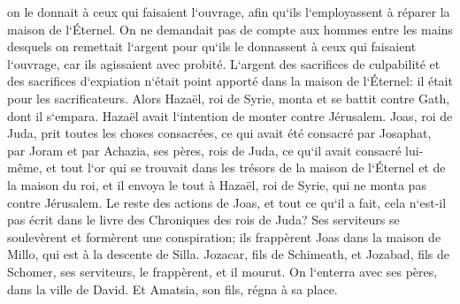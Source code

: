 \verse on le donnait à ceux qui faisaient l`ouvrage, afin qu`ils l`employassent à réparer la maison de l`Éternel. 
\verse On ne demandait pas de compte aux hommes entre les mains desquels on remettait l`argent pour qu`ils le donnassent à ceux qui faisaient l`ouvrage, car ils agissaient avec probité. 
\verse L`argent des sacrifices de culpabilité et des sacrifices d`expiation n`était point apporté dans la maison de l`Éternel: il était pour les sacrificateurs. 
\verse Alors Hazaël, roi de Syrie, monta et se battit contre Gath, dont il s`empara. Hazaël avait l`intention de monter contre Jérusalem. 
\verse Joas, roi de Juda, prit toutes les choses consacrées, ce qui avait été consacré par Josaphat, par Joram et par Achazia, ses pères, rois de Juda, ce qu`il avait consacré lui-même, et tout l`or qui se trouvait dans les trésors de la maison de l`Éternel et de la maison du roi, et il envoya le tout à Hazaël, roi de Syrie, qui ne monta pas contre Jérusalem. 
\verse Le reste des actions de Joas, et tout ce qu`il a fait, cela n`est-il pas écrit dans le livre des Chroniques des rois de Juda? 
\verse Ses serviteurs se soulevèrent et formèrent une conspiration; ils frappèrent Joas dans la maison de Millo, qui est à la descente de Silla. 
\verse Jozacar, fils de Schimeath, et Jozabad, fils de Schomer, ses serviteurs, le frappèrent, et il mourut. On l`enterra avec ses pères, dans la ville de David. Et Amatsia, son fils, régna à sa place. 

\chapter{}

